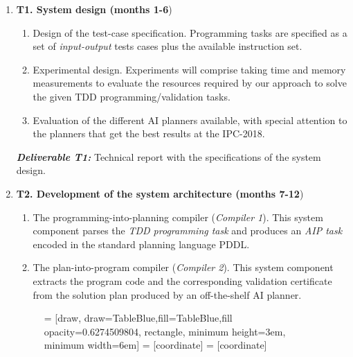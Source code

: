 \documentclass[10pt,a4paper]{paper}
\begin{document}
\begin{enumerate}
\item {\bf T1. System design (months 1-6})
  \begin{small}
    \begin{enumerate}
    \item Design of the test-case specification. Programming tasks are specified as a set of {\em input-output} tests cases plus the available instruction set. 
    \item Experimental design. Experiments will comprise taking time and memory measurements to evaluate the resources required by our approach to solve the given TDD programming/validation tasks.
    \item Evaluation of the different AI planners available, with special attention to the planners that get the best results at the IPC-2018. 
      \end{enumerate}
  \end{small}

{\small{\bf\em  Deliverable T1:} Technical report with the specifications of the system design.}
  
  \item {\bf T2. Development of the system architecture (months 7-12})
    \begin{small}
      \begin{enumerate}
      \item The programming-into-planning compiler ({\em Compiler 1}). This system component parses the {\em TDD programming task} and produces an {\em AIP task} encoded in the standard planning language PDDL.
      \item The plan-into-program compiler ({\em Compiler 2}). This system component extracts the program code and the corresponding validation certificate from the solution plan produced by an off-the-shelf AI planner.
      \end{enumerate}
\end{small}      

\begin{figure}[hbt!]
 = [draw, draw=TableBlue,fill=TableBlue,fill opacity=0.6274509804, rectangle, minimum height=3em, minimum width=6em]
 = [coordinate]
 = [coordinate]
\begin{center}
\end{center}
\end{figure}
\end{enumerate}
\end{document}
